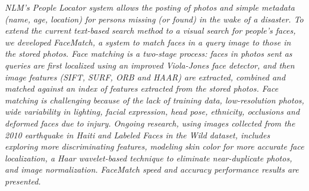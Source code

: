 
\begin{xpsectionbox}{}{}

\emph{\color{blue} NLM’s People Locator system allows the posting of photos and simple metadata (name, age, location) for persons missing (or found) in the wake of a disaster. To extend the current text-based search method to a visual search for people's faces, we developed FaceMatch, a system to match faces in a query image to those in the stored photos.
	Face matching is a two-stage process: faces in photos sent as queries are first localized using an improved Viola-Jones face detector, and then image features (SIFT, SURF, ORB and HAAR) are extracted, combined and matched against an index of features extracted from the stored photos. 
Face matching is challenging because of the lack of training data, low-resolution photos, wide variability in lighting, facial expression, head pose, ethnicity, occlusions and deformed faces due to injury.
Ongoing research, using images collected from the 2010 earthquake in Haiti and Labeled Faces in the Wild dataset, includes exploring more discriminating features, modeling skin color for more accurate face localization, a Haar wavelet-based technique to eliminate near-duplicate photos, and image normalization. FaceMatch speed and accuracy performance results are presented.}


\end{xpsectionbox}

